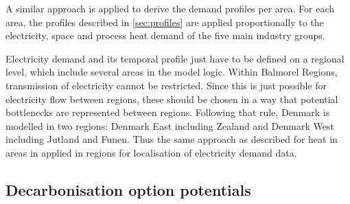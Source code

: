 \documentclass[review]{elsarticle}
\begin{document}
A similar approach is applied to derive the demand profiles per area. For each area, the profiles described in \autoref{sec:profiles} are applied proportionally to the electricity, space and process heat demand of the five main industry groups.

Electricity demand and its temporal profile just have to be defined on a regional level, which include several areas in the model logic. Within Balmorel Regions, transmission of electricity cannot be restricted. Since this is just possible for electricity flow between regions, these should be chosen in a way that potential bottlenecks are represented between regions. Following that rule, Denmark is modelled in two regions: Denmark East including Zealand and Denmark West including Jutland and Funen. Thus the same approach as described for heat in areas in applied in regions for localisation of electricity demand data.


\subsection{Decarbonisation option potentials}
\end{document}
